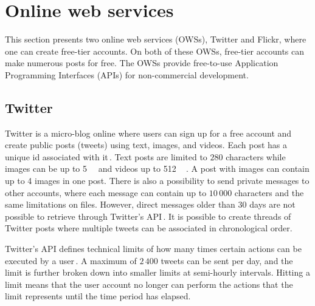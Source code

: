 \section{Online web services}
\label{sec:ows}
This section presents two online web services (OWSs), Twitter and Flickr, where one can create free-tier accounts. On both of these OWSs, free-tier accounts can make numerous posts for free. The OWSs provide free-to-use Application Programming Interfaces (APIs) for non-commercial development. 

\subsection{Twitter}
\label{subsec:ows_twitter}
Twitter is a micro-blog online where users can sign up for a free account and create public posts (tweets) using text, images, and videos. Each post has a unique id associated with it\,\cite{twitterTwitterIDs}. Text posts are limited to $280$ characters while images can be up to \SI{5}{\mega\byte} and videos up to \SI{512}{\mega\byte}\,\cite{MediaBestPractices}. A post with images can contain up to 4 images in one post. There is also a possibility to send private messages to other accounts, where each message can contain up to $10\,000$ characters and the same limitations on files. However, direct messages older than $30$ days are not possible to retrieve through Twitter's API\,\cite{RetrievingOlder302018}. It is possible to create threads of Twitter posts where multiple tweets can be associated in chronological order.

Twitter's API defines technical limits of how many times certain actions can be executed by a user\,\cite{UnderstandingTwitterLimits}. A maximum of $2\,400$ tweets can be sent per day, and the limit is further broken down into smaller limits at semi-hourly intervals. Hitting a limit means that the user account no longer can perform the actions that the limit represents until the time period has elapsed.

